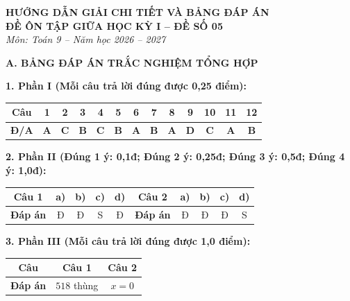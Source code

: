 \documentclass[12pt,a4paper]{article}
\begin{document}
\begin{center}
  \textbf{\Large HƯỚNG DẪN GIẢI CHI TIẾT VÀ BẢNG ĐÁP ÁN}\\
  \textbf{\large ĐỀ ÔN TẬP GIỮA HỌC KỲ I -- ĐỀ SỐ 05}\\
  \textit{Môn: Toán 9 -- Năm học 2026 -- 2027}
\end{center}
\vspace{2mm}

\noindent\textbf{\large A. BẢNG ĐÁP ÁN TRẮC NGHIỆM TỔNG HỢP}
\vspace{1mm}

\noindent\textbf{1. Phần I (Mỗi câu trả lời đúng được 0,25 điểm):}
\begin{center}
\begin{tabular}{|c|c|c|c|c|c|c|c|c|c|c|c|c|}
\hline
\textbf{Câu} & \textbf{1} & \textbf{2} & \textbf{3} & \textbf{4} & \textbf{5} & \textbf{6} & \textbf{7} & \textbf{8} & \textbf{9} & \textbf{10} & \textbf{11} & \textbf{12} \\
\hline
\textbf{Đ/A} & \textbf{A} & \textbf{C} & \textbf{B} & \textbf{C} & \textbf{B} & \textbf{A} & \textbf{B} & \textbf{A} & \textbf{D} & \textbf{C} & \textbf{A} & \textbf{B} \\
\hline
\end{tabular}
\end{center}
\vspace{0.5mm}

\noindent\textbf{2. Phần II (Đúng 1 ý: 0,1đ; Đúng 2 ý: 0,25đ; Đúng 3 ý: 0,5đ; Đúng 4 ý: 1,0đ):}
\begin{center}
\begin{tabular}{|c|c|c|c|c||c|c|c|c|c|}
\hline
\textbf{Câu 1} & \textbf{a)} & \textbf{b)} & \textbf{c)} & \textbf{d)} & \textbf{Câu 2} & \textbf{a)} & \textbf{b)} & \textbf{c)} & \textbf{d)} \\
\hline
\textbf{Đáp án} & Đ & Đ & S & Đ & \textbf{Đáp án} & Đ & Đ & Đ & S \\
\hline
\end{tabular}
\end{center}
\vspace{0.5mm}

\noindent\textbf{3. Phần III (Mỗi câu trả lời đúng được 1,0 điểm):}
\begin{center}
\begin{tabular}{|c|c|c|}
\hline
\textbf{Câu} & \textbf{Câu 1} & \textbf{Câu 2} \\
\hline
\textbf{Đáp án} & $518$ thùng & $x = 0$ \\
\hline
\end{tabular}
\end{center}
\vspace{2mm}
\end{document}
